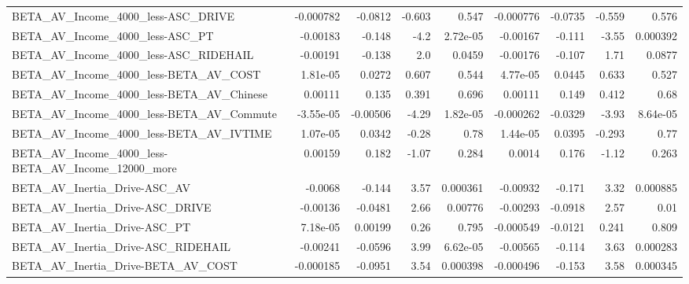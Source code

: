 \begin{tabular}{lrrrrrrrr}
BETA\_AV\_Income\_4000\_less-ASC\_DRIVE                 &   -0.000782 &      -0.0812 &   -0.603 &    0.547 &  -0.000776 &     -0.0735 &       -0.559 &         0.576 \\
BETA\_AV\_Income\_4000\_less-ASC\_PT                    &    -0.00183 &       -0.148 &     -4.2 & 2.72e-05 &   -0.00167 &      -0.111 &        -3.55 &      0.000392 \\
BETA\_AV\_Income\_4000\_less-ASC\_RIDEHAIL              &    -0.00191 &       -0.138 &      2.0 &   0.0459 &   -0.00176 &      -0.107 &         1.71 &        0.0877 \\
BETA\_AV\_Income\_4000\_less-BETA\_AV\_COST              &    1.81e-05 &       0.0272 &    0.607 &    0.544 &   4.77e-05 &      0.0445 &        0.633 &         0.527 \\
BETA\_AV\_Income\_4000\_less-BETA\_AV\_Chinese           &     0.00111 &        0.135 &    0.391 &    0.696 &    0.00111 &       0.149 &        0.412 &          0.68 \\
BETA\_AV\_Income\_4000\_less-BETA\_AV\_Commute           &   -3.55e-05 &     -0.00506 &    -4.29 & 1.82e-05 &  -0.000262 &     -0.0329 &        -3.93 &      8.64e-05 \\
BETA\_AV\_Income\_4000\_less-BETA\_AV\_IVTIME            &    1.07e-05 &       0.0342 &    -0.28 &     0.78 &   1.44e-05 &      0.0395 &       -0.293 &          0.77 \\
BETA\_AV\_Income\_4000\_less-BETA\_AV\_Income\_12000\_more &     0.00159 &        0.182 &    -1.07 &    0.284 &     0.0014 &       0.176 &        -1.12 &         0.263 \\
BETA\_AV\_Inertia\_Drive-ASC\_AV                       &     -0.0068 &       -0.144 &     3.57 & 0.000361 &   -0.00932 &      -0.171 &         3.32 &      0.000885 \\
BETA\_AV\_Inertia\_Drive-ASC\_DRIVE                    &    -0.00136 &      -0.0481 &     2.66 &  0.00776 &   -0.00293 &     -0.0918 &         2.57 &          0.01 \\
BETA\_AV\_Inertia\_Drive-ASC\_PT                       &    7.18e-05 &      0.00199 &     0.26 &    0.795 &  -0.000549 &     -0.0121 &        0.241 &         0.809 \\
BETA\_AV\_Inertia\_Drive-ASC\_RIDEHAIL                 &    -0.00241 &      -0.0596 &     3.99 & 6.62e-05 &   -0.00565 &      -0.114 &         3.63 &      0.000283 \\
BETA\_AV\_Inertia\_Drive-BETA\_AV\_COST                 &   -0.000185 &      -0.0951 &     3.54 & 0.000398 &  -0.000496 &      -0.153 &         3.58 &      0.000345 \\

\end{tabular}
